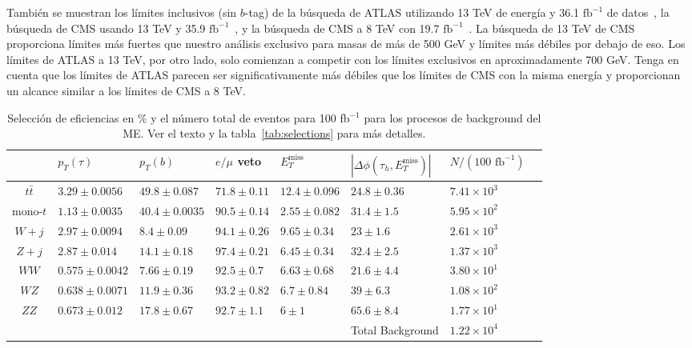 También se muestran los límites inclusivos (sin $b$-tag) de la búsqueda de ATLAS utilizando 13 TeV de energía y 36.1 $\text{fb}^{- 1}$ de datos~\cite{Aaboud:2018vgh}, la búsqueda de CMS usando 13 TeV y 35.9 $\text{fb}^{- 1}$~\cite{CMS:2018vff}, y la búsqueda de CMS a 8 TeV con 19.7 $\text{fb}^{- 1}$~\cite{Khachatryan:2015pua}. La búsqueda de 13 TeV de CMS proporciona límites más fuertes que nuestro análisis exclusivo para masas de más de 500 GeV y límites más débiles por debajo de eso. Los límites de ATLAS a 13 TeV, por otro lado, solo comienzan a competir con los límites exclusivos en aproximadamente 700 GeV. Tenga en cuenta que los límites de ATLAS parecen ser significativamente más débiles que los límites de CMS con la misma energía y proporcionan un alcance similar a los límites de CMS a 8 TeV.

\begin{table}[htbp]
\resizebox{17.3cm}{!} {
\begin{tabular}{clllllll}\hline
{} &       $p_T(\tau)$ &             $p_T(b)$ & $e/\mu$ veto & $E_T^{\text{miss}}$ &      $|\Delta \phi (\tau_h,E_T^{\text{miss}})|$ & $N/(\text{100 fb}^{-1})$ \\\hline
$t\bar{t}$    & $3.29 \pm 0.0056$  &   $49.8 \pm 0.087$ &   $71.8 \pm 0.11$ &  $12.4 \pm 0.096$ &  $24.8 \pm 0.36$& $7.41\times 10^{3}$ \\
mono-$t$   & $1.13 \pm 0.0035$ &   $40.4 \pm 0.0035$ &   $90.5 \pm 0.14$ &   $2.55 \pm 0.082$ &   $31.4 \pm 1.5$&$5.95\times 10^{2}$ \\
$W+j$    &   $2.97 \pm 0.0094$ &   $8.4 \pm 0.09$ &   $94.1 \pm 0.26$ &    $9.65 \pm 0.34$ &     $23 \pm 1.6$ &$2.61\times 10^{3}$\\
$Z+j$      &    $2.87 \pm 0.014$ &    $14.1 \pm 0.18$ &   $97.4 \pm 0.21$ &  $6.45 \pm 0.34$ &   $32.4 \pm 2.5$ &$1.37\times 10^{3}$\\
$WW$    & $0.575 \pm 0.0042$ &  $7.66 \pm 0.19$ &    $92.5 \pm 0.7$ &  $6.63 \pm 0.68$ &   $21.6 \pm 4.4$&$3.80\times 10^{1}$ \\
$WZ$     &    $0.638 \pm 0.0071$&  $11.9 \pm 0.36$ &   $93.2 \pm 0.82$ & $6.7 \pm 0.84$ &     $39 \pm 6.3$ &$1.08\times 10^{2}$\\
$ZZ$      &        $0.673 \pm 0.012$&   $17.8 \pm 0.67$ &    $92.7 \pm 1.1$ &     $6 \pm 1$ &   $65.6 \pm 8.4$&$1.77\times 10^{1}$ \\
\hline
&&&&&Total Background&$1.22\times 10^{4}$\\
\end{tabular} }
\caption {Selección de eficiencias en \% y el número total de eventos para 100 fb$^{-1}$ para los procesos de background del ME. Ver el texto y la tabla~\ref{tab:selections} para más detalles.}
\label{tab:cutefficiencySMnew}
\end{table}


